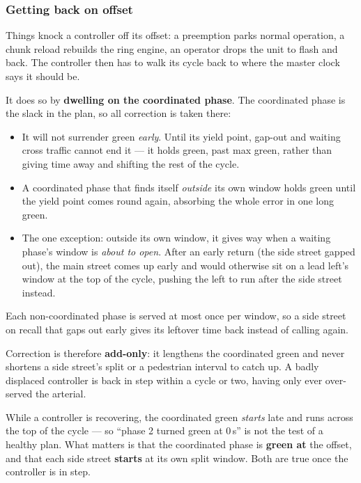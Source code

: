 \documentclass[11pt]{article}
\begin{document}
\subsubsection*{Getting back on offset}

Things knock a controller off its offset: a preemption parks normal operation, a
chunk reload rebuilds the ring engine, an operator drops the unit to flash and
back. The controller then has to walk its cycle back to where the master clock
says it should be.

It does so by \textbf{dwelling on the coordinated phase}. The coordinated phase
is the slack in the plan, so all correction is taken there:

\begin{itemize}[nosep]
  \item It will not surrender green \emph{early}. Until its yield point, gap-out
        and waiting cross traffic cannot end it --- it holds green, past max
        green, rather than giving time away and shifting the rest of the cycle.
  \item A coordinated phase that finds itself \emph{outside} its own window holds
        green until the yield point comes round again, absorbing the whole error
        in one long green.
  \item The one exception: outside its own window, it gives way when a waiting
        phase's window is \emph{about to open}. After an early return (the side
        street gapped out), the main street comes up early and would otherwise
        sit on a lead left's window at the top of the cycle, pushing the left to
        run after the side street instead.
\end{itemize}

Each non-coordinated phase is served at most once per window, so a side street on
recall that gaps out early gives its leftover time back instead of calling again.

Correction is therefore \textbf{add-only}: it lengthens the coordinated green and
never shortens a side street's split or a pedestrian interval to catch up. A
badly displaced controller is back in step within a cycle or two, having only
ever over-served the arterial.

\begin{tipbox}
While a controller is recovering, the coordinated green \emph{starts} late and
runs across the top of the cycle --- so ``phase 2 turned green at 0\,s'' is not
the test of a healthy plan. What matters is that the coordinated phase is
\textbf{green at} the offset, and that each side street \textbf{starts} at its own
split window. Both are true once the controller is in step.
\end{tipbox}
\end{document}

